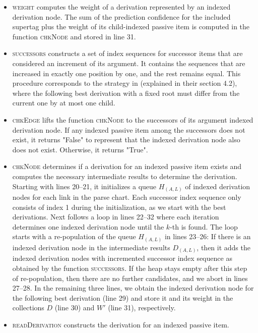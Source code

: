 \documentclass[../../document.tex]{subfiles}
\begin{document}
    \begin{itemize}
        \item \textsc{weight} computes the weight of a derivation represented by an indexed derivation node.
            The sum of the prediction confidence for the included supertag plus the weight of its child-indexed passive item is computed in the function \textsc{chkNode} and stored in line 31.
        \item \textsc{successors} constructs a set of index sequences for successor items that are considered an increment of its argument.
            It contains the sequences that are increased in exactly one position by one, and the rest remains equal.
            This procedure corresponds to the strategy in  (explained in their section 4.2), where the following best derivation with a fixed root must differ from the current one by at most one child.
        \item \textsc{chkEdge} lifts the function \textsc{chkNode} to the successors of its argument indexed derivation node.
            If any indexed passive item among the successors does not exist, it returns "False" to represent that the indexed derivation node also does not exist. Otherwise, it returns "True".
        \item \textsc{chkNode} determines if a derivation for an indexed passive item exists and computes the necessary intermediate results to determine the derivation.
            Starting with lines 20--21, it initializes a queue \(H_{(A, L)}\) of indexed derivation nodes for each link in the parse chart.
            Each successor index sequence only consists of index 1 during the initialization, as we start with the best derivations.
            Next follows a loop in lines 22--32 where each iteration determines one indexed derivation node until the \(k\)-th is found.
            The loop starts with a re-population of the queue \(H_{(A, L)}\) in lines 23--26:
                If there is an indexed derivation node in the intermediate results \(D_{(A, L)}\), then it adds the indexed derivation nodes with incremented successor index sequence as obtained by the function \textsc{successors}.
            If the heap stays empty after this step of re-population, then there are no further candidates, and we abort in lines 27--28.
            In the remaining three lines, we obtain the indexed derivation node for the following best derivation (line 29) and store it and its weight in the collections $D$ (line 30) and $W'$ (line 31), respectively.
        \item \textsc{readDerivation} constructs the derivation for an indexed passive item.

\end{itemize}
\end{document}
